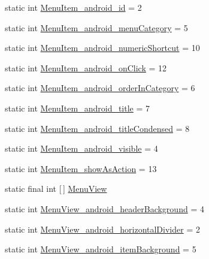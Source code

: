 \begin{DoxyCompactItemize}
static int \hyperlink{classandroid_1_1support_1_1design_1_1R_1_1styleable_afbda85862c50bb6b1d1c07d43301305f}{Menu\+Item\+\_\+android\+\_\+id} = 2
\item 
static int \hyperlink{classandroid_1_1support_1_1design_1_1R_1_1styleable_a391ab3f07c8b267f8d014751cc656800}{Menu\+Item\+\_\+android\+\_\+menu\+Category} = 5
\item 
static int \hyperlink{classandroid_1_1support_1_1design_1_1R_1_1styleable_a5776dc6f7dd431ab1dd1ea84537d4015}{Menu\+Item\+\_\+android\+\_\+numeric\+Shortcut} = 10
\item 
static int \hyperlink{classandroid_1_1support_1_1design_1_1R_1_1styleable_a9484e64b62aa88502a3a5c401944589e}{Menu\+Item\+\_\+android\+\_\+on\+Click} = 12
\item 
static int \hyperlink{classandroid_1_1support_1_1design_1_1R_1_1styleable_a63a7fd821acd701fe9d619cd623638b6}{Menu\+Item\+\_\+android\+\_\+order\+In\+Category} = 6
\item 
static int \hyperlink{classandroid_1_1support_1_1design_1_1R_1_1styleable_a763cbf62cbe6f3aa61ca4b0a2ba68494}{Menu\+Item\+\_\+android\+\_\+title} = 7
\item 
static int \hyperlink{classandroid_1_1support_1_1design_1_1R_1_1styleable_aa151f315fb220476a341678d66a423be}{Menu\+Item\+\_\+android\+\_\+title\+Condensed} = 8
\item 
static int \hyperlink{classandroid_1_1support_1_1design_1_1R_1_1styleable_af825b4c38a96b3cba91a45cd9f65e9f9}{Menu\+Item\+\_\+android\+\_\+visible} = 4
\item 
static int \hyperlink{classandroid_1_1support_1_1design_1_1R_1_1styleable_ab142dfa8fe8f756ee789d58e501b7c1b}{Menu\+Item\+\_\+show\+As\+Action} = 13
\item 
static final int \mbox{[}$\,$\mbox{]} \hyperlink{classandroid_1_1support_1_1design_1_1R_1_1styleable_acaf80b4eb554eab1b6f3b7f929ac7039}{Menu\+View}
\item 
static int \hyperlink{classandroid_1_1support_1_1design_1_1R_1_1styleable_a38f013733be3380a35b5c18a342f420f}{Menu\+View\+\_\+android\+\_\+header\+Background} = 4
\item 
static int \hyperlink{classandroid_1_1support_1_1design_1_1R_1_1styleable_acd977854a2afdaf80b462337a6a55b96}{Menu\+View\+\_\+android\+\_\+horizontal\+Divider} = 2
\item 
static int \hyperlink{classandroid_1_1support_1_1design_1_1R_1_1styleable_a1ec0468c04c0d2612a6212d4448d2ad6}{Menu\+View\+\_\+android\+\_\+item\+Background} = 5
\item 

\end{DoxyCompactItemize}

